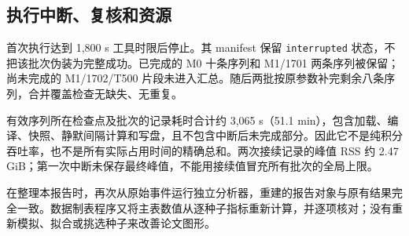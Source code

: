 \subsection{执行中断、复核和资源}
首次执行达到 1,800 s 工具时限后停止。其 manifest 保留 \texttt{interrupted} 状态，不把该批次伪装为完整成功。已完成的 M0 十条序列和 M1/1701 两条序列被保留；尚未完成的 M1/1702/T500 片段未进入汇总。随后两批按原参数补完剩余八条序列，合并覆盖检查无缺失、无重复。

有效序列所在检查点及批次的记录耗时合计约 3,065 s（51.1 min），包含加载、编译、快照、静默间隔计算和写盘，且不包含中断后未完成部分。因此它不是纯积分吞吐率，也不是所有实际占用时间的精确总和。两次接续记录的峰值 RSS 约 2.47 GiB；第一次中断未保存最终峰值，不能用接续值冒充所有批次的全局上限。

在整理本报告时，再次从原始事件运行独立分析器，重建的报告对象与原有结果完全一致。数据制表程序又将主表数值从逐种子指标重新计算，并逐项核对；没有重新模拟、拟合或挑选种子来改善论文图形。
\FloatBarrier
